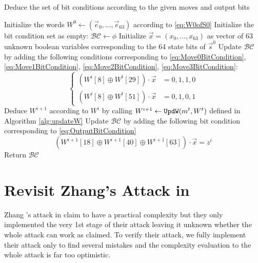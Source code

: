 \begin{algorithm}[htbp]
	\caption{Deduce the set of bit conditions according to the given moves and output bits} \label{alg:getBC}
	\begin{algorithmic}[1]
\State Initialize the words $W^0\leftarrow (\vec e_0,\ldots, \vec e_{63})$ according to \eqref{eq:W0ofS0}
\State Initialize the bit condition set as empty: $\mathcal{BC}\leftarrow \phi$
\State Initialize $\vec{x}=(x_0,\ldots, x_{63})$ as vector of 63 unknown boolean variables corresponding to the 64 state bits of $\vec s^0$
\State Update $\mathcal{BC}$ by adding the following conditions corresponding to \eqref{eq:Move0BitCondition}, \eqref{eq:Move1BitCondition}, \eqref{eq:Move2BitCondition}, \eqref{eq:Move3BitCondition}:
\[
\left\{
\begin{aligned}
(W^i[8]\oplus W^t[29])\cdot \vec x&=0,1,1,0\\
(W^i[8]\oplus W^t[51])\cdot \vec x&=0,1,0,1
\end{aligned}
\right.
\]
\EndIf
\State Deduce $W^{i+1}$ according to $W^{i}$ by calling $W^{i+1}\leftarrow {\tt UpdW}(m^t,W^t)$ defined in Algorithm \ref{alg:updateW}
\State Update $\mathcal{BC}$ by adding the following bit condition corresponding to \eqref{eq:OutputBitCondition}
\[
(W^{i+1}[18]\oplus W^{i+1}[40]\oplus W^{i+1}[63])\cdot \vec x =z^i
\]
\EndFor
\State Return $\mathcal{BC}$
		\EndProcedure
	\end{algorithmic}
\end{algorithm}


\section{Revisit Zhang's Attack in \cite{AC:Zhang19}}
Zhang \etal's attack in \cite{AC:Zhang19} claim to have a practical complexity but they only implemented the very 1st stage of their attack leaving it unknown whether the whole attack can work as claimed.
To verify their attack, we fully implement their attack only to find several mistakes and the complexity evaluation to the whole attack is far too optimistic.
